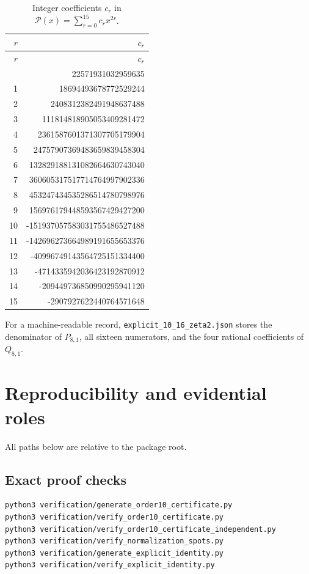 \documentclass[11pt]{article}
\theoremstyle{definition}
\begin{document}
\begin{longtable}{r@{\qquad}r}
\caption{Integer coefficients $c_r$ in $\mathscr P(x)=\sum_{r=0}^{15}c_rx^{2r}$.\label{tab:explicit-coefficients}}\\
\toprule
$r$&$c_r$\\
\midrule
\endfirsthead
\toprule
$r$&$c_r$\\
\midrule
\endhead
\bottomrule
\endfoot
0&22571931032959635\\
1&18694493678772529244\\
2&2408312382491948637488\\
3&111814818905053409281472\\
4&2361587601371307705179904\\
5&24757907369483659839458304\\
6&132829188131082664630743040\\
7&360605317517714764997902336\\
8&453247434535286514780798976\\
9&156976179448593567429427200\\
10&-151937057583031755486527488\\
11&-142696273664989191655653376\\
12&-40996749143564725151334400\\
13&-4714335942036423192870912\\
14&-209449736850990295941120\\
15&-2907927622440764571648\\
\end{longtable}

For a machine-readable record, \texttt{explicit\_10\_16\_zeta2.json} stores the denominator of $P_{8,1}$, all sixteen numerators, and the four rational coefficients of $Q_{8,1}$.
 \section{Reproducibility and evidential roles}
\label{app:reproducibility}

All paths below are relative to the package root.

\subsection{Exact proof checks}

\begin{lstlisting}[language=bash]
python3 verification/generate_order10_certificate.py
python3 verification/verify_order10_certificate.py
python3 verification/verify_order10_certificate_independent.py
python3 verification/verify_normalization_spots.py
python3 verification/generate_explicit_identity.py
python3 verification/verify_explicit_identity.py
\end{lstlisting}
\end{document}

